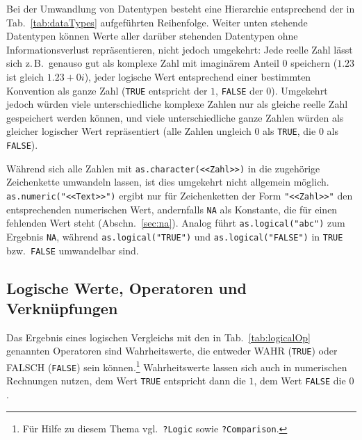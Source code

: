 Bei der Umwandlung von Datentypen besteht eine Hierarchie entsprechend der in Tab.\ \ref{tab:dataTypes} aufgeführten Reihenfolge. Weiter unten stehende Datentypen können Werte aller darüber stehenden Datentypen ohne Informationsverlust repräsentieren, nicht jedoch umgekehrt: Jede reelle Zahl lässt sich z.\,B.\ genauso gut als komplexe Zahl mit imaginärem Anteil $0$ speichern ($1.23$ ist gleich $1.23+0i$), jeder logische Wert entsprechend einer bestimmten Konvention als ganze Zahl (\lstinline!TRUE! entspricht der $1$, \lstinline!FALSE! der $0$). Umgekehrt jedoch würden viele unterschiedliche komplexe Zahlen nur als gleiche reelle Zahl gespeichert werden können, und viele unterschiedliche ganze Zahlen würden als gleicher logischer Wert repräsentiert (alle Zahlen ungleich $0$ als \lstinline!TRUE!, die $0$ als \lstinline!FALSE!).

Während sich alle Zahlen mit \lstinline!as.character(<<Zahl>>)! in die zugehörige Zeichenkette umwandeln lassen, ist dies umgekehrt nicht allgemein möglich. \lstinline!as.numeric("<<Text>>")! ergibt nur für Zeichenketten der Form \lstinline!"<<Zahl>>"! den entsprechenden numerischen Wert, andernfalls \lstinline!NA! als Konstante, die für einen fehlenden Wert steht (Abschn.\ \ref{sec:na}). Analog führt \lstinline!as.logical("abc")! zum Ergebnis \lstinline!NA!, während \lstinline!as.logical("TRUE")! und \lstinline!as.logical("FALSE")! in \lstinline!TRUE! bzw.\ \lstinline!FALSE! umwandelbar sind.

\subsection{Logische Werte, Operatoren und Verknüpfungen}
\label{sec:isTRUE}

Das Ergebnis eines logischen Vergleichs mit den in Tab.\ \ref{tab:logicalOp} genannten Operatoren sind Wahrheitswerte, die entweder WAHR (\lstinline!TRUE!) oder FALSCH (\lstinline!FALSE!) sein können.\footnote{Für Hilfe zu diesem Thema vgl.\ \lstinline!?Logic! sowie \lstinline!?Comparison!.} Wahrheitswerte lassen sich auch in numerischen Rechnungen nutzen, dem Wert \lstinline!TRUE! entspricht dann die $1$, dem Wert \lstinline!FALSE! die $0$.

